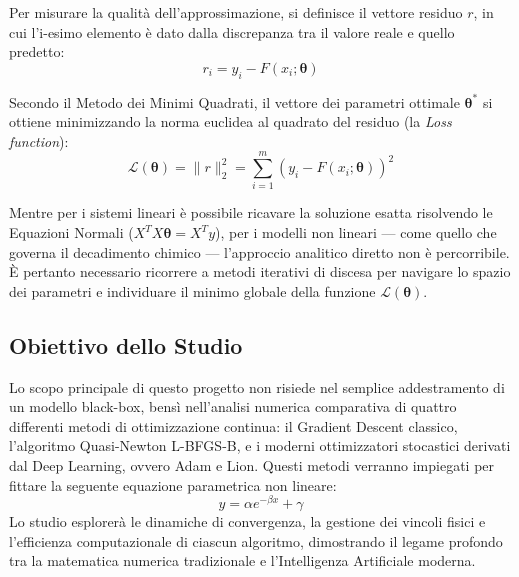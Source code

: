 \documentclass[11pt, a4paper]{article}
\begin{document}
Per misurare la qualità dell'approssimazione, si definisce il vettore residuo $r$, in cui l'i-esimo elemento è dato dalla discrepanza tra il valore reale e quello predetto:
\begin{equation}
    r_i = y_i - F(x_i; \boldsymbol{\theta})
\end{equation}

Secondo il Metodo dei Minimi Quadrati, il vettore dei parametri ottimale $\boldsymbol{\theta}^*$ si ottiene minimizzando la norma euclidea al quadrato del residuo (la \textit{Loss function}):
\begin{equation}
    \mathcal{L}(\boldsymbol{\theta}) = \|r\|_2^2 = \sum_{i=1}^{m} \left(y_i - F(x_i; \boldsymbol{\theta})\right)^2
\end{equation}

Mentre per i sistemi lineari è possibile ricavare la soluzione esatta risolvendo le Equazioni Normali ($X^T X \boldsymbol{\theta} = X^T y$), per i modelli non lineari --- come quello che governa il decadimento chimico --- l'approccio analitico diretto non è percorribile. È pertanto necessario ricorrere a metodi iterativi di discesa per navigare lo spazio dei parametri e individuare il minimo globale della funzione $\mathcal{L}(\boldsymbol{\theta})$.

\subsection{Obiettivo dello Studio}
Lo scopo principale di questo progetto non risiede nel semplice addestramento di un modello black-box, bensì nell'analisi numerica comparativa di quattro differenti metodi di ottimizzazione continua: il Gradient Descent classico, l'algoritmo Quasi-Newton L-BFGS-B, e i moderni ottimizzatori stocastici derivati dal Deep Learning, ovvero Adam e Lion. Questi metodi verranno impiegati per fittare la seguente equazione parametrica non lineare:
\begin{equation}
    y = \alpha e^{-\beta x} + \gamma
\end{equation}
Lo studio esplorerà le dinamiche di convergenza, la gestione dei vincoli fisici e l'efficienza computazionale di ciascun algoritmo, dimostrando il legame profondo tra la matematica numerica tradizionale e l'Intelligenza Artificiale moderna.





\end{document}
